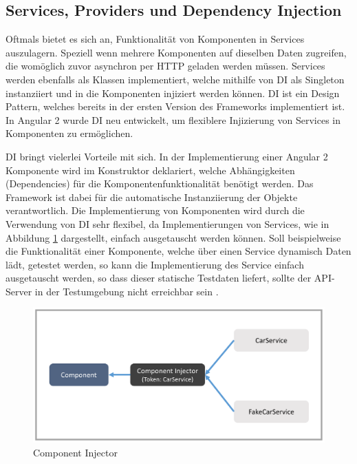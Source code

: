 \newpage



\vspace{0.3cm}




\subsection{Services, Providers und Dependency Injection}
\label{sec:services}

Oftmals bietet es sich an, Funktionalität von Komponenten in Services auszulagern.
Speziell wenn mehrere Komponenten auf dieselben Daten zugreifen,
die womöglich zuvor asynchron per HTTP geladen werden müssen.
Services werden ebenfalls als Klassen implementiert, welche mithilfe von \ac{DI}
als Singleton instanziiert und in die Komponenten injiziert werden können.
\ac{DI} ist ein Design Pattern, welches bereits in der ersten Version des Frameworks implementiert ist.
In Angular 2 wurde \ac{DI} neu entwickelt, um flexiblere Injizierung von Services in Komponenten zu ermöglichen.

\ac{DI} bringt vielerlei Vorteile mit sich. In der Implementierung einer Angular 2 Komponente wird im
Konstruktor deklariert, welche Abhängigkeiten (Dependencies) für die Komponentenfunktionalität benötigt werden.
Das Framework ist dabei für die automatische Instanziierung der Objekte verantwortlich.
Die Implementierung von Komponenten wird durch die Verwendung von \ac{DI} sehr flexibel,
da Implementierungen von Services, wie in Abbildung \ref{service-injection} dargestellt, einfach ausgetauscht werden können.
Soll beispielweise die Funktionalität einer Komponente, welche über einen Service dynamisch Daten lädt, getestet werden,
so kann die Implementierung des Service einfach ausgetauscht werden, so dass dieser statische Testdaten liefert,
sollte der API-Server in der Testumgebung nicht erreichbar sein \cite[281]{Angular2}.


\vspace{0.3cm}

\begin{figure}[ht]
 \centering
 \includegraphics[width=0.8\linewidth]{kapitel3/component-injector.png}
 \caption{Component Injector \cite[343]{Angular2}}
 \label{service-injection}
\end{figure}
\vspace{0.3cm}

